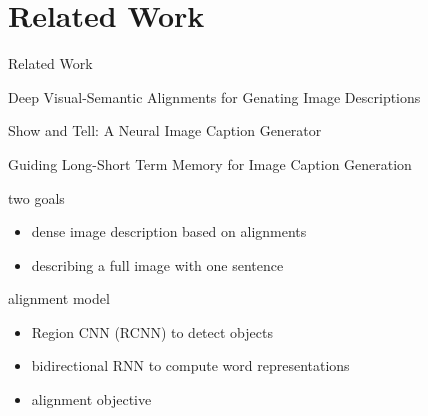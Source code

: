 \documentclass[16pt]{beamer}
\newenvironment{wideitemize}{\itemize\addtolength{\itemsep}{10pt}}{\enditemize}
\begin{document}
\section{Related Work}%
\begin{frame}{Related Work}
\begin{wideitemize}
\item Deep Visual-Semantic Alignments for Genating Image Descriptions \cite{Karpathy2015}
\item Show and Tell: A Neural Image Caption Generator \cite{Google}
\item Guiding Long-Short Term Memory for Image Caption Generation \cite{Fernando2015}
\end{wideitemize}
\end{frame}

\begin{frame}{\cite{Karpathy2015}}
\begin{wideitemize}
\item two goals
\begin{itemize}
\item dense image description based on alignments
\item describing a full image with one sentence 
\end{itemize}
\item alignment model
    \begin{itemize}
    \item Region CNN (RCNN) to detect objects \cite{Girshick2014}
    \item bidirectional RNN to compute word representations
    \item alignment objective
    \end{itemize}
\end{wideitemize}
\end{frame}
\end{document}
